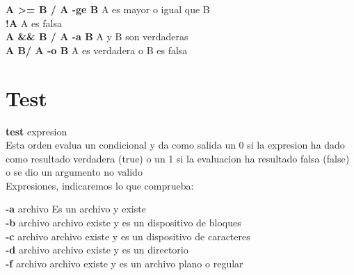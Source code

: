 \documentclass[11pt]{article}
\begin{document}
\textbf{A \textgreater =  B / A -ge B}\hspace{2cm}  A es mayor o igual que B\\ 

\textbf{!A} \hspace{4cm} A es falsa\\

\textbf{A \&\& B / A -a B} \hspace{2cm} A y B son verdaderas\\

\textbf{A \textbar\textbar B/ A -o B} \hspace{4cm} A es verdadera o B es falsa


 
\section{Test}
 
 \textbf{test} expresion \\
 Esta orden evalua un condicional y da como salida un 0 si la expresion ha dado como resultado verdadera (true) o un 1 si la evaluacion ha resultado falsa (false) o se dio un argumento no valido \\
 
 Expresiones, indicaremos lo que comprueba:\\
 
\vspace{3mm}

\hspace{2cm} \textbf{-a} archivo \hspace{2cm}  Es un archivo y existe\\

\hspace{2cm} \textbf{-b} archivo \hspace{2cm} archivo existe y es un dispositivo de bloques \\

\hspace{2cm} \textbf{-c} archivo \hspace{2cm} archivo existe y es un dispositivo de caracteres \\

\hspace{2cm} \textbf{-d} archivo \hspace{2cm} archivo existe y es un directorio \\

\hspace{2cm} \textbf{-f} archivo \hspace{2cm} archivo existe y es un archivo plano o regular \\
\end{document}
